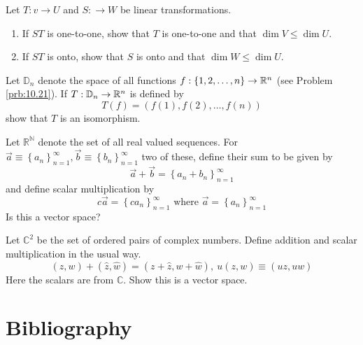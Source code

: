 \documentclass{ximera}
\begin{document}
\begin{problem}\label{prob:nich7.3.13}
    Let $T:v\rightarrow U$ and $S:\rightarrow W$ be linear transformations.
    \begin{enumerate}
        \item If $ST$ is one-to-one, show that $T$ is one-to-one and that $\dim V\leq \dim U$.
        \item If $ST$ is onto, show that $S$ is onto and that $\dim W\leq \dim U$.
    \end{enumerate}
\end{problem}

\begin{problem}\label{prob:nich7.3.18}
    Let $\mathbb{D}_n$ denote the space of all functions $f:\{1, 2, \dots, n\}\rightarrow\mathbb{R}^n$ (see Problem \ref{prb:10.21}).  If $T:\mathbb{D}_n\rightarrow \mathbb{R}^n$ is defined by 
    $$T(f)=(f(1), f(2), \dots, f(n))$$
    show that $T$ is an isomorphism.
\end{problem}

\begin{problem}\label{prb:10.6} Let $\mathbb{R}^{\mathbb{N}}$ denote the set of all real valued sequences.
For $\vec{a}\equiv \left\{ a_{n}\right\} _{n=1}^{\infty },\vec{b}\equiv
\left\{ b_{n}\right\} _{n=1}^{\infty }$ two of these, define their sum to be
given by
\begin{equation*}
\vec{a}+\vec{b} =  \left\{ a_{n}+b_{n}\right\} _{n=1}^{\infty }
\end{equation*}
and define scalar multiplication by
\begin{equation*}
c\vec{a}=\left\{ ca_{n}\right\} _{n=1}^{\infty }\text{ where }\vec{a}
=\left\{ a_{n}\right\} _{n=1}^{\infty }
\end{equation*}
Is this a vector space?
\end{problem}

\begin{problem}\label{prb:10.7} Let $\mathbb{C}^{2}$ be the set of ordered pairs of complex numbers.
Define addition and scalar multiplication in the usual way.
\begin{equation*}
\left( z,w\right) +\left( \hat{z},\hat{w}\right) = \left( z+\hat{z},w+
\hat{w}\right) ,\ u\left( z,w\right) \equiv \left( uz,uw\right)
\end{equation*}
Here the scalars are from $\mathbb{C}$. Show this is a vector space.

\end{problem}


\section*{Bibliography}
\end{document}
